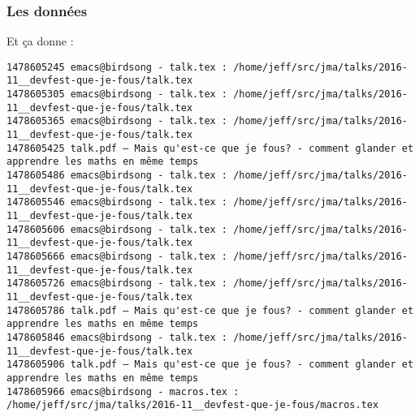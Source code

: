 \begin{frame}[fragile]
  \frametitle{Les données}
  Et ça donne :
  \vspace{1cm}
  \begin{Verbatim}
1478605245 emacs@birdsong - talk.tex : /home/jeff/src/jma/talks/2016-11__devfest-que-je-fous/talk.tex
1478605305 emacs@birdsong - talk.tex : /home/jeff/src/jma/talks/2016-11__devfest-que-je-fous/talk.tex
1478605365 emacs@birdsong - talk.tex : /home/jeff/src/jma/talks/2016-11__devfest-que-je-fous/talk.tex
1478605425 talk.pdf — Mais qu'est-ce que je fous? - comment glander et apprendre les maths en même temps
1478605486 emacs@birdsong - talk.tex : /home/jeff/src/jma/talks/2016-11__devfest-que-je-fous/talk.tex
1478605546 emacs@birdsong - talk.tex : /home/jeff/src/jma/talks/2016-11__devfest-que-je-fous/talk.tex
1478605606 emacs@birdsong - talk.tex : /home/jeff/src/jma/talks/2016-11__devfest-que-je-fous/talk.tex
1478605666 emacs@birdsong - talk.tex : /home/jeff/src/jma/talks/2016-11__devfest-que-je-fous/talk.tex
1478605726 emacs@birdsong - talk.tex : /home/jeff/src/jma/talks/2016-11__devfest-que-je-fous/talk.tex
1478605786 talk.pdf — Mais qu'est-ce que je fous? - comment glander et apprendre les maths en même temps
1478605846 emacs@birdsong - talk.tex : /home/jeff/src/jma/talks/2016-11__devfest-que-je-fous/talk.tex
1478605906 talk.pdf — Mais qu'est-ce que je fous? - comment glander et apprendre les maths en même temps
1478605966 emacs@birdsong - macros.tex : /home/jeff/src/jma/talks/2016-11__devfest-que-je-fous/macros.tex
  \end{Verbatim}
\end{frame}

\begin{frame}
\end{frame}

\begin{frame}
\end{frame}

\begin{frame}
\end{frame}

\begin{frame}
\end{frame}

\begin{frame}
\end{frame}

\begin{frame}
\end{frame}

